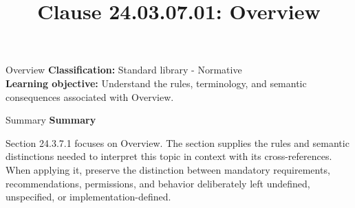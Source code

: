 \documentclass[10pt,letterpaper]{article}
\title{Clause 24.03.07.01: Overview}
\author{}
\date{}
\begin{document}
\maketitle
\begin{CornellOverviewBox}{Overview}
\textbf{Classification:} Standard library - Normative\\[2pt]
\textbf{Learning objective:} Understand the rules, terminology, and semantic consequences associated with Overview.
\end{CornellOverviewBox}\begin{CornellSummaryBox}{Summary}
{\sffamily\bfseries\color{Accent} Summary}\par\vspace{3pt}Section 24.3.7.1 focuses on Overview. The section supplies the rules and semantic distinctions needed to interpret this topic in context with its cross-references. When applying it, preserve the distinction between mandatory requirements, recommendations, permissions, and behavior deliberately left undefined, unspecified, or implementation-defined.
\end{CornellSummaryBox}
\end{document}
